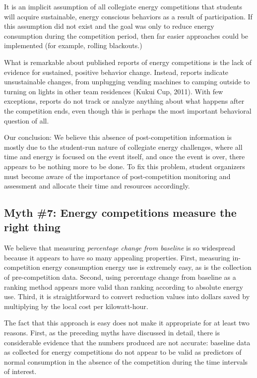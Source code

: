 \documentclass[jou]{apa} %
\begin{document}
It is an implicit assumption of all collegiate energy competitions that students will acquire
sustainable, energy conscious behaviors as a result of participation. If this assumption
did not exist and the goal was only to reduce energy consumption during the competition
period, then far easier approaches could be implemented (for example, rolling blackouts.)

What is remarkable about published reports of energy competitions is the lack of evidence
for sustained, positive behavior change. Instead, reports indicate unsustainable changes,
from unplugging vending machines \cite{Petersen07a} to camping outside \cite{Hodge2010} to 
turning on lights in other team residences (Kukui Cup, 2011).   With few exceptions, reports do not
track or analyze anything about what happens after the competition ends, even though this
is perhaps the most important behavioral question of all.  

Our conclusion: We believe this absence of post-competition information is mostly due to
the student-run nature of collegiate energy challenges, where all time and energy is
focused on the event itself, and once the event is over, there appears to be nothing more
to be done. To fix this problem, student organizers must become aware of the importance of
post-competition monitoring and assessment and allocate their time and resources
accordingly.

\subsection{Myth \#7: Energy competitions measure the right thing}

We believe that measuring {\em percentage change from baseline} is so widespread because
it appears to have so many appealing properties.  First, measuring in-competition energy
consumption energy use is extremely easy, as is the collection of pre-competition data.
Second, using percentage change from baseline as a ranking method appears more valid than
ranking according to absolute energy use. Third, it is straightforward to convert reduction
values into dollars saved by multiplying by the local cost per kilowatt-hour.

The fact that this approach is easy does not make it appropriate for at least two
reasons.  First, as the preceding myths have discussed in detail, there is considerable
evidence that the numbers produced are not accurate: baseline data as collected for energy
competitions do not appear to be valid as predictors of normal consumption in the absence
of the competition during the time intervals of interest.  
\end{document}
